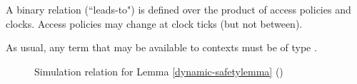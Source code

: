 \documentclass[10pt]{article}
\begin{document}
A binary relation  (``leads-to") is defined over the product of access policies and clocks. Access policies may change at clock ticks (but not between).

As usual, any term that may be available to contexts must be of type .

\begin{figure}
\vspace{-1.0cm}
\hspace{-1.8cm}\fbox{\parbox{15.6cm}{\small
















}}
\caption{Simulation relation for Lemma \ref{dynamic-safetylemma} ()}
\label{fig:simreln-4-d}
\end{figure}
\end{document}
